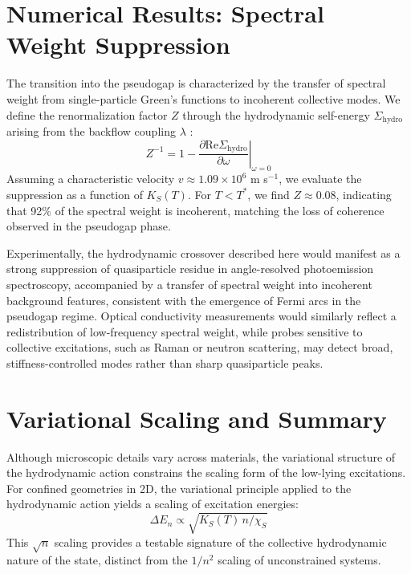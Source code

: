 \documentclass[11pt, a4paper]{article}
\begin{document}
        \section{Numerical Results: Spectral Weight Suppression}

            The transition into the pseudogap is characterized by the transfer of spectral weight from single-particle Green's functions to incoherent collective modes. We define the renormalization factor $Z$ through the hydrodynamic self-energy $\Sigma_{\text{hydro}}$ arising from the backflow coupling $\lambda$ \cite{Baym1961}:
            \begin{equation}
                Z^{-1} = 1 - \left. \frac{\partial \text{Re} \Sigma_{\text{hydro}}}{\partial \omega} \right|_{\omega=0}
            \end{equation}
            Assuming a characteristic velocity $v \approx 1.09 \times 10^6$ m s$^{-1}$, we evaluate the suppression as a function of $K_S(T)$. For $T < T^*$, we find $Z \approx 0.08$, indicating that 92\% of the spectral weight is incoherent, matching the loss of coherence observed in the pseudogap phase.

            Experimentally, the hydrodynamic crossover described here would manifest as a strong suppression of quasiparticle residue in angle-resolved photoemission spectroscopy, accompanied by a transfer of spectral weight into incoherent background features, consistent with the emergence of Fermi arcs in the pseudogap regime. Optical conductivity measurements would similarly reflect a redistribution of low-frequency spectral weight, while probes sensitive to collective excitations, such as Raman or neutron scattering, may detect broad, stiffness-controlled modes rather than sharp quasiparticle peaks.

        \section{Variational Scaling and Summary}

            Although microscopic details vary across materials, the variational structure of the hydrodynamic action constrains the scaling form of the low-lying excitations. For confined geometries in 2D, the variational principle applied to the hydrodynamic action yields a scaling of excitation energies:
            \begin{equation}
                \Delta E_n \propto \sqrt{K_S(T)\, n / \chi_S}
            \end{equation}
            This $\sqrt{n}$ scaling provides a testable signature of the collective hydrodynamic nature of the state, distinct from the $1/n^2$ scaling of unconstrained systems.
\end{document}
